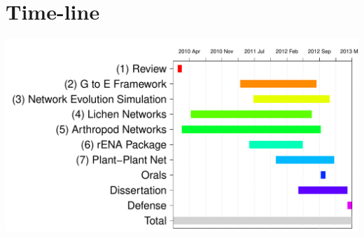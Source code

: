 \documentclass[12pt]{article}
\begin{document}
\section{Time-line}

\includegraphics{meeting_notes_May2012-001}



\end{document}
